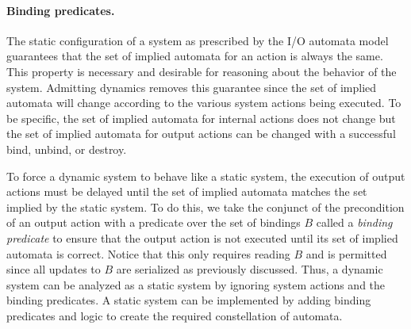 \paragraph{Binding predicates.}
The static configuration of a system as prescribed by the I/O automata model guarantees that the set of implied automata for an action is always the same.
This property is necessary and desirable for reasoning about the behavior of the system.
Admitting dynamics removes this guarantee since the set of implied automata will change according to the various system actions being executed.
To be specific, the set of implied automata for internal actions does not change but the set of implied automata for output actions can be changed with a successful bind, unbind, or destroy.

To force a dynamic system to behave like a static system, the execution of output actions must be delayed until the set of implied automata matches the set implied by the static system.
To do this, we take the conjunct of the precondition of an output action with a predicate over the set of bindings $B$ called a \emph{binding predicate} to ensure that the output action is not executed until its set of implied automata is correct.
Notice that this only requires reading $B$ and is permitted since all updates to $B$ are serialized as previously discussed.
Thus, a dynamic system can be analyzed as a static system by ignoring system actions and the binding predicates.
A static system can be implemented by adding binding predicates and logic to create the required constellation of automata.
